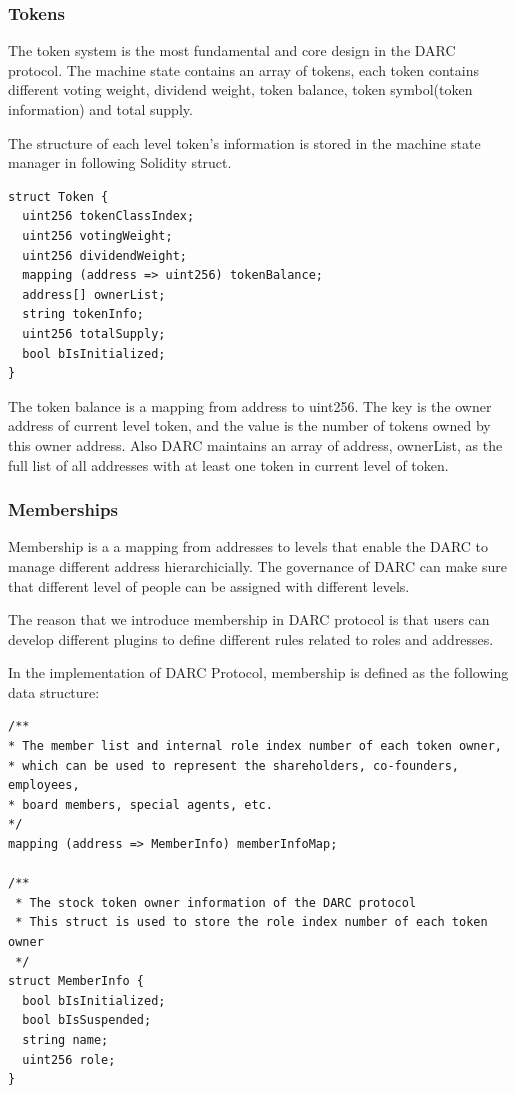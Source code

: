 \documentclass[main.tex]{subfiles}
\begin{document}
\subsubsection{Tokens}

The token system is the most fundamental and core design in the DARC protocol. The machine state contains an array of tokens, each token contains different voting weight, dividend weight, token balance, token symbol(token information) and total supply.

The structure of each level token's information is stored in the machine state manager in following Solidity struct.

\begin{verbatim}
struct Token {
  uint256 tokenClassIndex;
  uint256 votingWeight;
  uint256 dividendWeight;
  mapping (address => uint256) tokenBalance;
  address[] ownerList;
  string tokenInfo;
  uint256 totalSupply;
  bool bIsInitialized;
}
\end{verbatim}

The token balance is a mapping from address to uint256. The key is the owner address of current level token, and the value is the number of tokens owned by this owner address. Also DARC maintains an array of address, ownerList, as the full list of all addresses with at least one token in current level of token.

\subsubsection{Memberships}

Membership is a a mapping from addresses to levels that enable the DARC to manage different address hierarchicially. The governance of DARC can make sure that different level of people can be assigned with different levels.

The reason that we introduce membership in DARC protocol is that users can develop different plugins to define different rules related to roles and addresses.

In the implementation of DARC Protocol, membership is defined as the following data structure:

\begin{verbatim}
/**
* The member list and internal role index number of each token owner,
* which can be used to represent the shareholders, co-founders, employees, 
* board members, special agents, etc.
*/
mapping (address => MemberInfo) memberInfoMap;

/**
 * The stock token owner information of the DARC protocol
 * This struct is used to store the role index number of each token owner
 */
struct MemberInfo {
  bool bIsInitialized;
  bool bIsSuspended;
  string name;
  uint256 role;
}
\end{verbatim}
\end{document}
